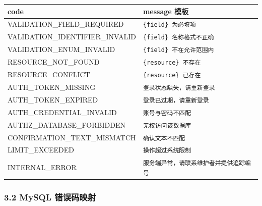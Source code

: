 \documentclass[
  a4paper,
  UTF8]{ctexart}
\begin{document}
\begin{longtable}[]{@{}ll@{}}
\toprule
code & message 模板 \\
\midrule
\endhead
VALIDATION\_FIELD\_REQUIRED & \texttt{\{field\}\ 为必填项} \\
VALIDATION\_IDENTIFIER\_INVALID & \texttt{\{field\}\ 名称格式不正确} \\
VALIDATION\_ENUM\_INVALID & \texttt{\{field\}\ 不在允许范围内} \\
RESOURCE\_NOT\_FOUND & \texttt{\{resource\}\ 不存在} \\
RESOURCE\_CONFLICT & \texttt{\{resource\}\ 已存在} \\
AUTH\_TOKEN\_MISSING & \texttt{登录状态缺失，请重新登录} \\
AUTH\_TOKEN\_EXPIRED & \texttt{登录已过期，请重新登录} \\
AUTH\_CREDENTIAL\_INVALID & \texttt{账号与密码不匹配} \\
AUTHZ\_DATABASE\_FORBIDDEN & \texttt{无权访问该数据库} \\
CONFIRMATION\_TEXT\_MISMATCH & \texttt{确认文本不匹配} \\
LIMIT\_EXCEEDED & \texttt{操作超过系统限制} \\
INTERNAL\_ERROR & \texttt{服务端异常，请联系维护者并提供追踪编号} \\
\bottomrule
\end{longtable}

\hypertarget{mysql-ux9519ux8befux7801ux6620ux5c04}{%
\subsubsection{3.2 MySQL
错误码映射}\label{mysql-ux9519ux8befux7801ux6620ux5c04}}
\end{document}
